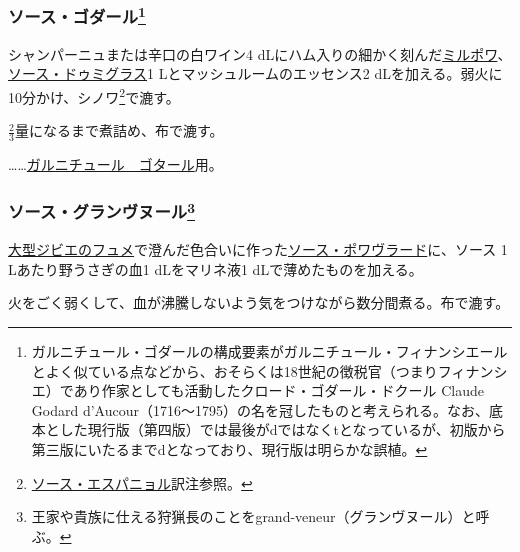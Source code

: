 \begin{recette}
\hypertarget{sauce-godard}{%
\subsubsection[ソース・ゴダール]{\texorpdfstring{ソース・ゴダール\footnote{ガルニチュール・ゴダールの構成要素がガルニチュール・フィナンシエールとよく似ている点などから、おそらくは18世紀の徴税官（つまりフィナンシエ）であり作家としても活動したクロード・ゴダール・ドクール
  Claude Godard
  d'Aucour（1716〜1795）の名を冠したものと考えられる。なお、底本とした現行版（第四版）では最後がdではなくtとなっているが、初版から第三版にいたるまでdとなっており、現行版は明らかな誤植。}}{ソース・ゴダール}}\label{sauce-godard}}



シャンパーニュまたは辛口の白ワイン4
dLにハム入りの細かく刻んだ\protect\hyperlink{mirepoix}{ミルポワ}、\protect\hyperlink{sauce-demi-glace}{ソース・ドゥミグラス}1
Lとマッシュルームのエッセンス2
dLを加える。弱火に10分かけ、シノワ\footnote{\protect\hyperlink{sauce-espagnole}{ソース・エスパニョル}訳注参照。}で漉す。

\(\frac{2}{3}\)量になるまで煮詰め、布で漉す。

\ldots{}\ldots{}\protect\hyperlink{garniture-godard}{ガルニチュール　ゴタール}用。

\hypertarget{sauce-grand-veneur}{%
\subsubsection[ソース・グランヴヌール]{\texorpdfstring{ソース・グランヴヌール\footnote{王家や貴族に仕える狩猟長のことをgrand-veneur（グランヴヌール）と呼ぶ。}}{ソース・グランヴヌール}}\label{sauce-grand-veneur}}



\protect\hyperlink{fonds-de-gibier}{大型ジビエのフュメ}で澄んだ色合いに作った\protect\hyperlink{sauce-poivrade}{ソース・ポワヴラード}に、ソース
1 Lあたり野うさぎの血1 dLをマリネ液1 dLで薄めたものを加える。

火をごく弱くして、血が沸騰しないよう気をつけながら数分間煮る。布で漉す。


\end{recette}
